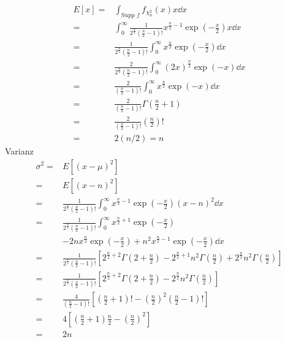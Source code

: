 \documentclass[prb,12pt]{revtex4-2}
\theoremstyle{definition}
\theoremstyle{definition}
\begin{document}
\begin{align*}
	E[x]=& \int_{\text{Supp }f}f_{\chi_n^2}(x) x\dd{x}\\
	=&\int_0^\infty \frac{1}{2^{\frac n2}\left( \frac{n}{2}-1 \right)! }x^{\frac{n}{2}-1}\exp\left( -\frac{x}{2} \right) x\dd{x}\\
	=&\frac{1}{2^{\frac{n}{2}}\left( \frac{n}{2}-1 \right)! }\int_0^\infty x^{\frac{n}{2}}\exp\left( -\frac{x}{2} \right) \dd{x}\\
	=&\frac{2}{2^{\frac{n}{2}}\left( \frac{n}{2}-1 \right)! }\int_0^\infty (2x)^{\frac{n}{2}}\exp\left( -x \right) \dd{x}\\
	=&\frac{2}{\left( \frac{n}{2}-1 \right)! }\int_0^\infty x^{\frac{n}{2}}\exp\left( -x \right) \dd{x}\\
	=&\frac{2}{\left(\frac{n}{2}-1\right)!}\Gamma\left( \frac{n}{2}+1 \right) \\
	=&\frac{2}{\left( \frac{n}{2}-1 \right)!}\left( \frac{n}{2} \right)!\\
	=& 2(n / 2) = n
\end{align*}
Varianz
\begin{align*}
	\sigma^2=& E[(x-\mu)^2]\\
	=&E[(x-n)^2]\\
	=&\frac{1}{2^{\frac{n}{2}}\left( \frac{n}{2}-1 \right)! }\int_0^\infty x^{\frac{n}{2}-1}\exp\left( -\frac{x}{2} \right) (x-n)^2\dd{x}\\
	=&\frac{1}{2^{\frac{n}{2}}\left( \frac{n}{2}-1 \right)!}\int_0^\infty x^{\frac{n}{2}+1}\exp\left( -\frac{x}{2}\right) \\
	&-2nx^{\frac{n}{2}}\exp\left( -\frac{x}{2} \right) +n^2 x^{\frac{n}{2}-1}\exp\left( -\frac{x}{2} \right) \dd{x}\\
	=& \frac{1}{2^{\frac{n}{2}}\left( \frac{n}{2}-1 \right)! }\left[2^{\frac{n}{2}+2}\Gamma\left( 2+\frac{n}{2} \right) -2^{\frac{n}{2}+1}n^2 \Gamma\left( \frac{n}{2} \right) +2^{\frac{n}{2}}n^2\Gamma\left( \frac{n}{2} \right) \right]\\
	=& \frac{1}{2^{\frac{n}{2}}\left( \frac{n}{2}-1 \right)! }\left[2^{\frac{n}{2}+2}\Gamma\left( 2+\frac{n}{2} \right) -2^{\frac{n}{2}}n^2 \Gamma\left( \frac{n}{2} \right)\right]\\
	=&\frac{4}{\left( \frac{n}{2}-1 \right)!} \left[ \left( \frac{n}{2}+1 \right)! - \left( \frac{n}{2} \right)^2 \left( \frac{n}{2}-1 \right)! \right]\\
	=&4\left[ \left( \frac{n}{2}+1 \right) \frac{n}{2}-\left( \frac{n}{2} \right)^2 \right]\\
	=&2n
\end{align*}
\end{document}
